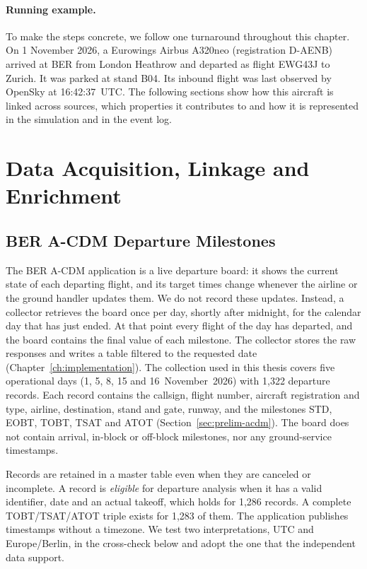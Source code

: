 \paragraph{Running example.}
To make the steps concrete, we follow one turnaround throughout this chapter. On 1 November 2026, a Eurowings Airbus A320neo (registration D-AENB) arrived at BER from London Heathrow and departed as flight EWG43J to Zurich. It was parked at stand B04. Its inbound flight was last observed by OpenSky at 16:42:37~UTC. The following sections show how this aircraft is linked across sources, which properties it contributes to and how it is represented in the simulation and in the event log.

\section{Data Acquisition, Linkage and Enrichment}
\label{sec:method-data}

\subsection{BER A-CDM Departure Milestones}
The BER A-CDM application is a live departure board: it shows the current state of each departing flight, and its target times change whenever the airline or the ground handler updates them. We do not record these updates. Instead, a collector retrieves the board once per day, shortly after midnight, for the calendar day that has just ended. At that point every flight of the day has departed, and the board contains the final value of each milestone. The collector stores the raw responses and writes a table filtered to the requested date (Chapter~\ref{ch:implementation}). The collection used in this thesis covers five operational days (1, 5, 8, 15 and 16~November~2026) with 1,322 departure records. Each record contains the callsign, flight number, aircraft registration and type, airline, destination, stand and gate, runway, and the milestones STD, EOBT, TOBT, TSAT and ATOT (Section~\ref{sec:prelim-acdm}). The board does not contain arrival, in-block or off-block milestones, nor any ground-service timestamps.

Records are retained in a master table even when they are canceled or incomplete. A record is \emph{eligible} for departure analysis when it has a valid identifier, date and an actual takeoff, which holds for 1,286 records. A complete TOBT/TSAT/ATOT triple exists for 1,283 of them. The application publishes timestamps without a timezone. We test two interpretations, UTC and Europe/Berlin, in the cross-check below and adopt the one that the independent data support.

